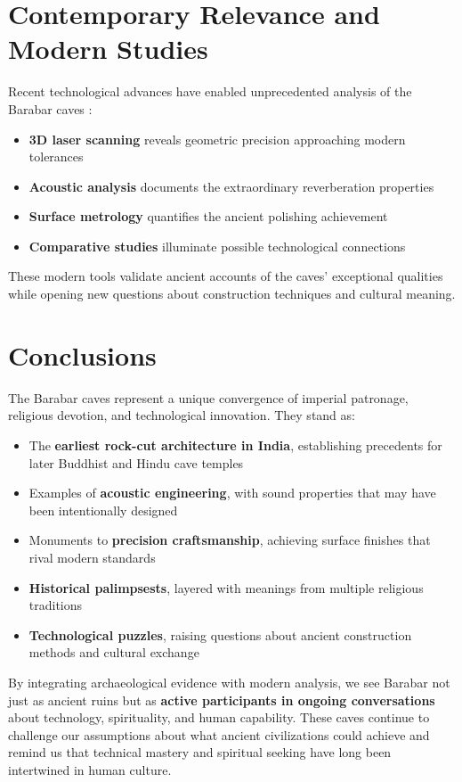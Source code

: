 \documentclass[11pt]{article}
\begin{document}
\section{Contemporary Relevance and Modern Studies}

Recent technological advances have enabled unprecedented analysis of the Barabar caves \cite{LaserScan2018,Acoustic2014}:

\begin{itemize}
\item \textbf{3D laser scanning} reveals geometric precision approaching modern tolerances
\item \textbf{Acoustic analysis} documents the extraordinary reverberation properties
\item \textbf{Surface metrology} quantifies the ancient polishing achievement
\item \textbf{Comparative studies} illuminate possible technological connections
\end{itemize}

These modern tools validate ancient accounts of the caves' exceptional qualities while opening new questions about construction techniques and cultural meaning.

\section{Conclusions}

The Barabar caves represent a unique convergence of imperial patronage, religious devotion, and technological innovation. They stand as:

\begin{itemize}
\item The \textbf{earliest rock-cut architecture in India}, establishing precedents for later Buddhist and Hindu cave temples
\item Examples of \textbf{acoustic engineering}, with sound properties that may have been intentionally designed
\item Monuments to \textbf{precision craftsmanship}, achieving surface finishes that rival modern standards
\item \textbf{Historical palimpsests}, layered with meanings from multiple religious traditions
\item \textbf{Technological puzzles}, raising questions about ancient construction methods and cultural exchange
\end{itemize}

By integrating archaeological evidence with modern analysis, we see Barabar not just as ancient ruins but as \textbf{active participants in ongoing conversations} about technology, spirituality, and human capability. These caves continue to challenge our assumptions about what ancient civilizations could achieve and remind us that technical mastery and spiritual seeking have long been intertwined in human culture.
\end{document}
